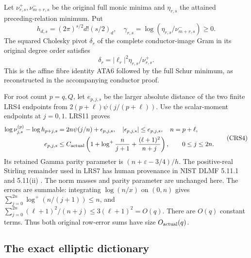 \documentclass[11pt,a4paper]{article}
\begin{document}
Let $\nu^+_{r,s},\nu^-_{m+r,s}$ be the original full monic minima and
$\eta_{r,s}$ the attained preceding-relation minimum. Put
\[
 h_{d,s}=(2\pi)^{s/2}d!(s/2)_d,\quad
 \gamma_{r,s}=\log(\eta_{r,s}/\nu^-_{m+r,s})\ge0.
\]
The squared Cholesky pivot $\delta_r$ of the complete conductor-image
Gram in its original degree order satisfies
\[
 \delta_r=|\ell_r|^2\eta_{r,s}/\nu^+_{r,s}.             \tag{CRS3}
\]
This is the affine fibre identity ATA6 followed by the full Schur
minimum, as reconstructed in the accompanying conductor proof.

For root count $p=q,Q$, let $e_{p,j,s}$ be the larger absolute distance
of the two finite LRS4 endpoints from $2(p+\ell)\psi(j/(p+\ell))$.
Use the scalar-moment endpoints at $j=0,1$. LRS11 proves
\[
\begin{split}
 \log\nu^{(p)}_{j,s}-\log h_{p+j,s}
 &=2n\psi(j/n)+\epsilon_{p,j,s},\quad
 |\epsilon_{p,j,s}|\le e_{p,j,s},\quad n=p+\ell,\\
 e_{p,j,s}&\le C_{\rm actual}
 \left(1+\log^+\frac{n}{j+1}+\frac{(\ell+1)^2}{n+j}\right),
 \qquad 0\le j\le2n .
\end{split}                                                    \tag{CRS4}
\]
Its retained Gamma parity parameter is $(n+\varepsilon-3/4)/h$.
The positive-real Stirling remainder used in LRS7 has human provenance
in NIST DLMF 5.11.1 and 5.11(ii) \cite[\S5.11]{a02crs:crs:dlmf5}.
The norm masses and parity parameter are unchanged here.
The errors are summable: integrating $\log(n/x)$ on $(0,n)$ gives
$\sum_{j=0}^{2n}\log^+(n/(j+1))\le n$, and
$\sum_{j=0}^{2n}(\ell+1)^2/(n+j)\le3(\ell+1)^2=O(q)$.
There are $O(q)$ constant terms. Thus both original row-error sums
have size $O_{\rm actual}(q)$.

\subsection{The exact elliptic dictionary}
\end{document}

